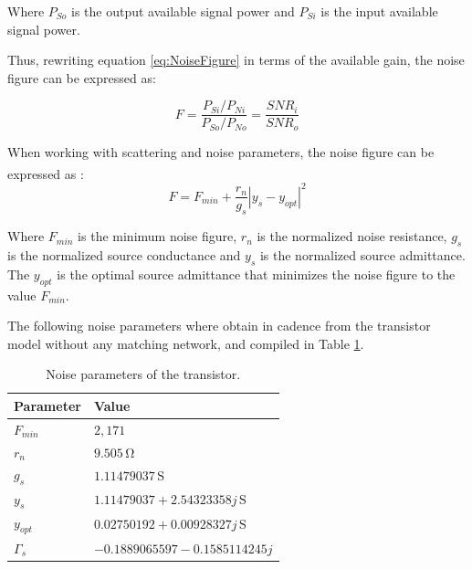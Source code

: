 Where $P_{So}$ is the output available signal power and $P_{Si}$ is the input available signal power.

Thus, rewriting equation \ref{eq:NoiseFigure} in terms of the available gain, the noise figure can be expressed as:

\begin{equation}
    F = \frac{P_{Si}/P_{Ni}}{P_{So}/P_{No}} = \frac{SNR_i}{SNR_o}
    \label{eq:NoiseFigure2}
\end{equation}

When working with scattering and noise parameters, the noise figure can be expressed as \textsuperscript{\cite{Gillermo-Gonzalez}}:
\begin{equation}
    F = F_{min} + \frac{r_n}{g_s}|y_s -y_{opt}|^2
    \label{eq:NoiseFigure3}
\end{equation}

Where $F_{min}$ is the minimum noise figure, $r_n$ is the normalized noise resistance, $g_s$ is the normalized source conductance and $y_s$ is the normalized source admittance. The $y_{opt}$ is the optimal source admittance that minimizes the noise figure to the value $F_{min}$.

The following noise parameters where obtain in cadence from the transistor model without any matching network, and compiled in Table \ref{tab:NoiseParameters}.

\begin{table}[H]
    \centering
    \caption{Noise parameters of the transistor.}
    \begin{tabularx}{\textwidth}{>{\centering\arraybackslash}X >{\centering\arraybackslash}X}
        \toprule
        \textbf{Parameter} & \textbf{Value} \\
        \midrule
        $F_{min}$     & $2,171$ \\
        \midrule
        $r_n$     & $9.505\,\si{\ohm}$\\
        \midrule
        $g_s$   & $1.11479037\,\si{\siemens}$ \\
        \midrule
        $y_s$   & $1.11479037+2.54323358j\,\si{\siemens}$ \\
        \midrule
        $y_{opt}$     & $0.02750192+0.00928327j\,\si{\siemens}$\\
        \midrule
        $\Gamma_s$     & $-0.1889065597-0.1585114245j$\\
        \bottomrule
    \end{tabularx}
    \label{tab:NoiseParameters}
\end{table}

